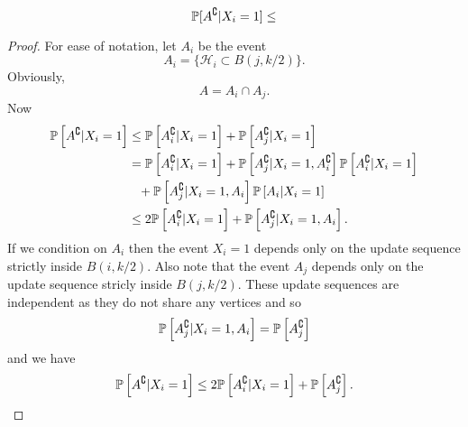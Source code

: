 \begin{lemma}
	\begin{equation}
		\mathbb{P}[A^\complement | X_i = 1] \leq 
	\end{equation}
\end{lemma}
\begin{proof}
	For ease of notation, let $A_i$ be the event
	\begin{equation}
		A_i = \{\mathcal{H}_i \subset B(j, k/2)\}.
	\end{equation}
	Obviously, 
	\begin{equation}
		A = A_i \cap A_j.
	\end{equation}
	Now
	\begin{align}
		\mathbb{P}\left[A^\complement | X_i = 1\right] &\leq \mathbb{P}\left[A_i^\complement | X_i = 1\right] + \mathbb{P}\left[A_j^\complement | X_i = 1\right]\\
		&= \mathbb{P}\left[A_i^\complement | X_i = 1\right] + \mathbb{P}\left[A_j^\complement | X_i = 1, A_i^\complement \right] \mathbb{P}\left[A_i^\complement | X_i = 1\right] \notag \\
		&\phantom{=} + \mathbb{P}\left[A_j^\complement | X_i = 1, A_i \right] \mathbb{P}\left[A_i | X_i = 1\right]\\
		&\leq 2\mathbb{P}\left[A_i^\complement | X_i = 1\right]+ \mathbb{P}\left[A_j^\complement | X_i = 1, A_i \right].\\
	\end{align}
	If we condition on $A_i$ then the event $X_i = 1$ depends only on the update sequence strictly inside $B(i, k/2)$. Also note that the event $A_j$ depends only on the update sequence stricly inside $B(j, k/2)$. These update sequences are independent as they do not share any vertices and so
	\begin{equation}
		\mathbb{P}\left[A_j^\complement | X_i = 1, A_i \right] = \mathbb{P}\left[A_j^\complement \right]
	\end{equation}
	and we have
	\begin{equation}
		\mathbb{P}\left[A^\complement | X_i = 1\right] \leq 2\mathbb{P}\left[A_i^\complement | X_i = 1\right]+ \mathbb{P}\left[A_j^\complement \right].
	\end{equation}
\end{proof}